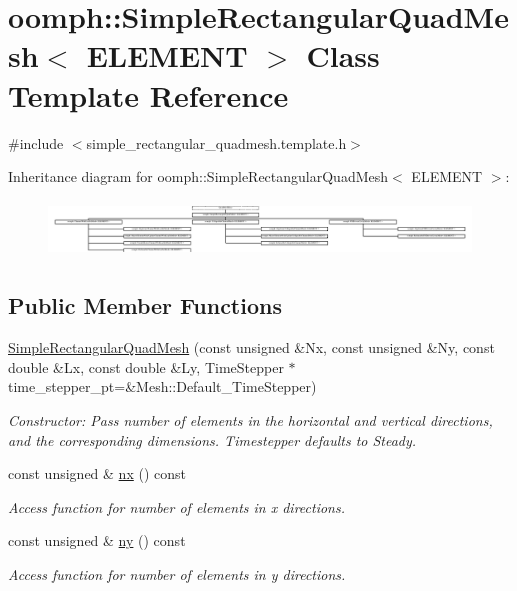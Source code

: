 \hypertarget{classoomph_1_1SimpleRectangularQuadMesh}{}\section{oomph\+:\+:Simple\+Rectangular\+Quad\+Mesh$<$ E\+L\+E\+M\+E\+NT $>$ Class Template Reference}
\label{classoomph_1_1SimpleRectangularQuadMesh}


{\ttfamily \#include $<$simple\+\_\+rectangular\+\_\+quadmesh.\+template.\+h$>$}

Inheritance diagram for oomph\+:\+:Simple\+Rectangular\+Quad\+Mesh$<$ E\+L\+E\+M\+E\+NT $>$\+:\begin{figure}[H]
\begin{center}
\leavevmode
\includegraphics[height=1.501916cm]{classoomph_1_1SimpleRectangularQuadMesh}
\end{center}
\end{figure}
\subsection*{Public Member Functions}
\begin{DoxyCompactItemize}
\item 
\hyperlink{classoomph_1_1SimpleRectangularQuadMesh_a8224b55f7d99a36debacb3f4cc293407}{Simple\+Rectangular\+Quad\+Mesh} (const unsigned \&Nx, const unsigned \&Ny, const double \&Lx, const double \&Ly, Time\+Stepper $\ast$time\+\_\+stepper\+\_\+pt=\&Mesh\+::\+Default\+\_\+\+Time\+Stepper)
\begin{DoxyCompactList}\small\item\em Constructor\+: Pass number of elements in the horizontal and vertical directions, and the corresponding dimensions. Timestepper defaults to Steady. \end{DoxyCompactList}\item 
const unsigned \& \hyperlink{classoomph_1_1SimpleRectangularQuadMesh_a4ff7678ec433180e2245ea2147f222b7}{nx} () const
\begin{DoxyCompactList}\small\item\em Access function for number of elements in x directions. \end{DoxyCompactList}\item 
const unsigned \& \hyperlink{classoomph_1_1SimpleRectangularQuadMesh_a45011f22dedd480392b1f376e4269921}{ny} () const
\begin{DoxyCompactList}\small\item\em Access function for number of elements in y directions. \end{DoxyCompactList}\end{DoxyCompactItemize}
